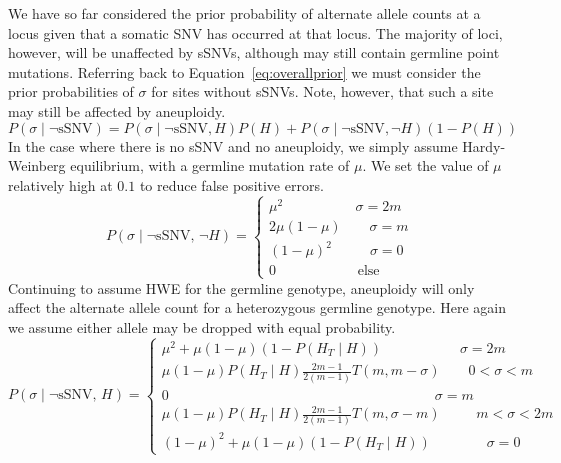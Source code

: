 \documentclass[../../main.tex]{subfiles}
\begin{document}
We have so far considered the prior probability of alternate allele counts at a locus given that a somatic SNV has occurred at that locus. The majority of loci, however, will be unaffected by sSNVs, although may still contain germline point mutations. Referring back to Equation~\eqref{eq:overallprior} we must consider the prior probabilities of $\sigma$ for sites without sSNVs. Note, however, that such a site may still be affected by aneuploidy.
\begin{equation}
P(\sigma\mid\neg\text{sSNV})=P(\sigma\mid\neg\text{sSNV},H)P(H)+P(\sigma\mid\neg\text{sSNV},\neg H)(1-P(H))
\end{equation} 
In the case where there is no sSNV and no aneuploidy, we simply assume Hardy-Weinberg equilibrium, with a germline mutation rate of $\mu$. We set the value of $\mu$ relatively high at $0.1$ to reduce false positive errors.
\begin{equation*}
P(\sigma\mid\neg\text{sSNV},\,\neg H) = \begin{cases} \mu^2\qquad\qquad\quad\,\sigma=2m\\ 2\mu(1-\mu) \qquad \sigma = m \\ (1-\mu)^2 \qquad \; \;\, \sigma=0 \\ 0 \qquad\qquad\quad\;\;\; \text{else} \end{cases}
\end{equation*}
Continuing to assume HWE for the germline genotype, aneuploidy will only affect the alternate allele count for a heterozygous germline genotype. Here again we assume either allele may be dropped with equal probability.
\begin{equation*}
P(\sigma\mid\neg\text{sSNV},\, H) = \begin{cases} \mu^2 + \mu(1-\mu)(1-P(H_T\mid H))\qquad\qquad\quad\;\; \sigma=2m\\
\mu(1-\mu)P(H_T\mid H)\frac{2m-1}{2(m-1)}T(m,m-\sigma) \qquad 0<\sigma<m\\
0 \qquad\qquad\qquad\qquad\qquad\qquad\qquad\qquad\qquad\quad \sigma=m \\
\mu(1-\mu)P(H_T\mid H)\frac{2m-1}{2(m-1)}T(m,\sigma-m) \qquad\;\; m<\sigma<2m\\
(1-\mu)^2 + \mu(1-\mu)(1-P(H_T\mid H)) \qquad\qquad \sigma=0 \end{cases}
\end{equation*}
\end{document}
